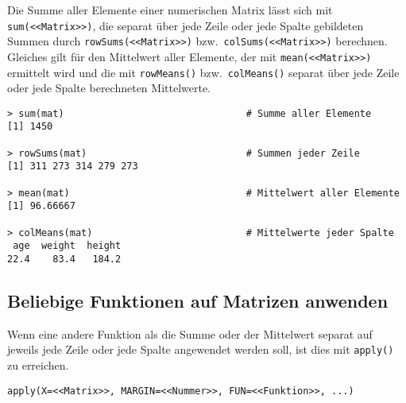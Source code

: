 Die Summe aller Elemente einer numerischen Matrix lässt sich mit \lstinline!sum(<<Matrix>>)!, die separat über jede Zeile oder jede Spalte gebildeten Summen durch \lstinline!rowSums(<<Matrix>>)! bzw.\ \lstinline!colSums(<<Matrix>>)! berechnen. Gleiches gilt für den Mittelwert aller Elemente, der mit \lstinline!mean(<<Matrix>>)! ermittelt wird und die mit \lstinline!rowMeans()! bzw.\ \lstinline!colMeans()! separat über jede Zeile oder jede Spalte berechneten Mittelwerte.
\begin{lstlisting}
> sum(mat)                                # Summe aller Elemente
[1] 1450

> rowSums(mat)                            # Summen jeder Zeile
[1] 311 273 314 279 273

> mean(mat)                               # Mittelwert aller Elemente
[1] 96.66667

> colMeans(mat)                           # Mittelwerte jeder Spalte
 age  weight  height
22.4    83.4   184.2
\end{lstlisting}

\subsection{Beliebige Funktionen auf Matrizen anwenden}
\label{sec:apply}

Wenn eine andere Funktion als die Summe oder der Mittelwert separat auf jeweils jede Zeile oder jede Spalte angewendet werden soll, ist dies mit \lstinline!apply()! zu erreichen.
\begin{lstlisting}
apply(X=<<Matrix>>, MARGIN=<<Nummer>>, FUN=<<Funktion>>, ...)
\end{lstlisting}

